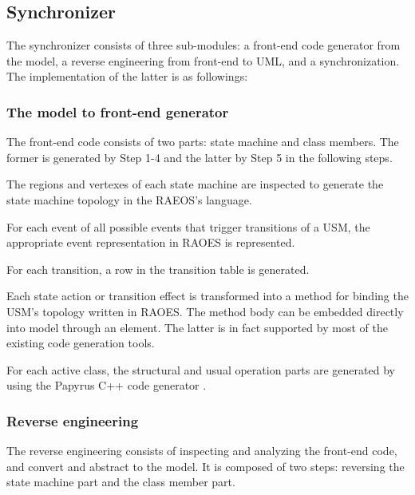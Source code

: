 \subsection{Synchronizer}
The synchronizer consists of three sub-modules: a front-end code generator from the model, a reverse engineering from front-end to UML, and a synchronization.
The implementation of the latter is as followings:

\noindent
\subsubsection{The model to front-end generator}
\label{subsubsec:gen}
The front-end code consists of two parts: state machine and class members.
The former is generated by Step 1-4 and the latter by Step 5 in the following steps.
\begin{description}[\footnotesize]
	\item[Step 1] %
	The regions and vertexes of each state machine %
	are inspected to generate the state machine topology in the RAEOS's language. 
	
	\item[Step 2]  
	For each event of all possible events that trigger transitions of a USM, the appropriate event representation in RAOES is represented.
	
	\item[Step 3] For each transition, a row in the transition table is generated.
	
	\item[Step 4] Each state action or transition effect is transformed into a method%
	for binding the USM's topology written in RAOES. 
	The method body can be embedded directly into model through an  element. 
	The latter is in fact supported by most of the existing code generation tools.
	
	\item[Step 5] For each active class, the structural and usual operation parts are generated by using the Papyrus C++ code generator \cite{_papyrus/designer/code-generation_????}. 
\end{description}

\noindent
\subsubsection{Reverse engineering}
\label{subsubsec:reverse}
The reverse engineering consists of inspecting and analyzing the front-end code, and convert and abstract to the model. 
It is composed of two steps: reversing the state machine part and the class member part.

